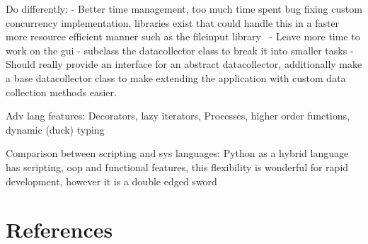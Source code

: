 \documentclass[11pt]{article}
\begin{document}
Do differently:
- Better time management, too much time spent bug fixing custom concurrency implementation, libraries exist that could handle this in a faster more resource efficient manner such as the fileinput library~\autocite{FileinputIterateLines}
- Leave more time to work on the gui
- subclass the datacollector class to break it into smaller tasks
- Should really provide an interface for an abstract datacollector, additionally make a base datacollector class to make extending the application with custom data collection methods easier.

Adv lang features:
Decorators, lazy iterators, Processes, higher order functions, dynamic (duck) typing

Comparison between scripting and sys languages:
Python as a hybrid language has scripting, oop and functional features, this flexibility is wonderful for rapid development, however it is a double edged sword

\pagebreak
\appendix
\section{References}
\printbibliography
\end{document}
